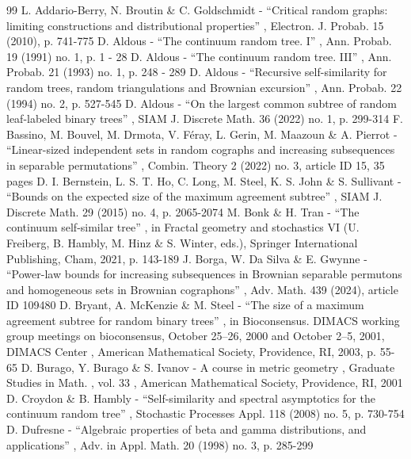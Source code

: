 \documentclass[11pt]{article}
\theoremstyle{plain}
\theoremstyle{definition}
\numberwithin{equation}{section}
\begin{document}

\begin{thebibliography}{99}
 L. Addario-Berry, N. Broutin \& C. Goldschmidt - “Critical random graphs: limiting constructions and distributional properties” , Electron. J. Probab. 15 (2010), p. 741-775
 D. Aldous - “The continuum random tree. I” , Ann. Probab. 19 (1991) no. 1, p. 1 - 28
 D. Aldous - “The continuum random tree. III” , Ann. Probab. 21 (1993) no. 1, p. 248 - 289
 D. Aldous - “Recursive self-similarity for random trees, random triangulations and Brownian excursion” , Ann. Probab. 22 (1994) no. 2, p. 527-545
 D. Aldous - “On the largest common subtree of random leaf-labeled binary trees” , SIAM J. Discrete Math. 36 (2022) no. 1, p. 299-314
 F. Bassino, M. Bouvel, M. Drmota, V. Féray, L. Gerin, M. Maazoun \& A. Pierrot - “Linear-sized independent sets in random cographs and increasing subsequences in separable permutations” , Combin. Theory 2 (2022) no. 3, article ID 15, 35 pages
 D. I. Bernstein, L. S. T. Ho, C. Long, M. Steel, K. S. John \& S. Sullivant - “Bounds on the expected size of the maximum agreement subtree” , SIAM J. Discrete Math. 29 (2015) no. 4, p. 2065-2074
 M. Bonk \& H. Tran - “The continuum self-similar tree” , in Fractal geometry and stochastics VI (U. Freiberg, B. Hambly, M. Hinz \& S. Winter, eds.), Springer International Publishing, Cham, 2021, p. 143-189
 J. Borga, W. Da Silva \& E. Gwynne - “Power-law bounds for increasing subsequences in Brownian separable permutons and homogeneous sets in Brownian cographons” , Adv. Math. 439 (2024), article ID 109480
 D. Bryant, A. McKenzie \& M. Steel - “The size of a maximum agreement subtree for random binary trees” , in Bioconsensus. DIMACS working group meetings on bioconsensus, October 25–26, 2000 and October 2–5, 2001, DIMACS Center , American Mathematical Society, Providence, RI, 2003, p. 55-65
 D. Burago, Y. Burago \& S. Ivanov - A course in metric geometry , Graduate Studies in Math. , vol. 33 , American Mathematical Society, Providence, RI, 2001
 D. Croydon \& B. Hambly - “Self-similarity and spectral asymptotics for the continuum random tree” , Stochastic Processes Appl. 118 (2008) no. 5, p. 730-754
 D. Dufresne - “Algebraic properties of beta and gamma distributions, and applications” , Adv. in Appl. Math. 20 (1998) no. 3, p. 285-299

\end{thebibliography}
\end{document}
